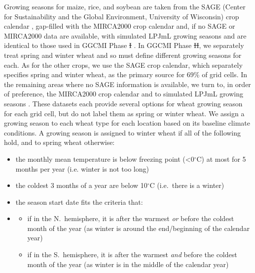 \documentclass[gmd, manuscript]{copernicus} %
\providecommand{\DIFadd}[1]{{\protect\color{blue}\uwave{#1}}} %
\providecommand{\DIFdel}[1]{{\protect\color{red}\sout{#1}}}                      %
\providecommand{\DIFaddbegin}{} %
\providecommand{\DIFaddend}{} %
\providecommand{\DIFdelbegin}{} %
\providecommand{\DIFdelend}{} %
\begin{document}
Growing seasons for maize, rice, and soybean are taken from the SAGE (Center for Sustainability and the Global Environment, University of Wisconsin) crop calendar \citep{Sacks2010}, gap-filled with the MIRCA2000 crop calendar \citep{Portmann2010} and, if no SAGE or MIRCA2000 data are available, with simulated LPJmL growing seasons \citep{waha2012climate} and are identical to those used in GGCMI Phase \DIFdelbegin \DIFdel{I }\DIFdelend \DIFaddbegin \DIFadd{1 }\DIFaddend \citep{Elliott2015}.
In GGCMI Phase \DIFdelbegin \DIFdel{II}\DIFdelend \DIFaddbegin \DIFadd{2}\DIFaddend , we separately treat spring and winter wheat and so must define different growing seasons for each.
As for the other crops, we use the SAGE crop calendar, which separately specifies spring and winter wheat, as the primary source for 69\% of grid cells. 
In the remaining areas where no SAGE information is available, we turn to, in order of preference, the MIRCA2000 crop calendar \citep{Portmann2010} and to simulated LPJmL growing seasons \citep{waha2012climate}.  
These datasets each provide several options for wheat growing season for each grid cell, but do not label them as spring or winter wheat. 
We assign a growing season to each wheat type for each location based on its baseline climate conditions. 
A growing season is assigned to winter wheat if all of the following hold, and to spring wheat otherwise:

\begin{itemize}
  \item{the monthly mean temperature is below freezing point (<0$^\circ$C) at most for 5 months per year (i.e. winter is not too long)}
  \item{the coldest 3 months of a year are below 10$^\circ$C (i.e.\ there is a winter)}
  \item{the season start date fits the criteria that:}
  \item[]{\begin{itemize}  
      \item{if in the N.\ hemisphere, it is after the warmest \textit{or} before the coldest month of the year (as winter is around the end/beginning of the calendar year)}
      \item{if in the S.\ hemisphere, it is after the warmest \textit{and} before the coldest month of the year (as winter is in the middle of the calendar year)}
      \end{itemize}}
\end{itemize}
\end{document}
